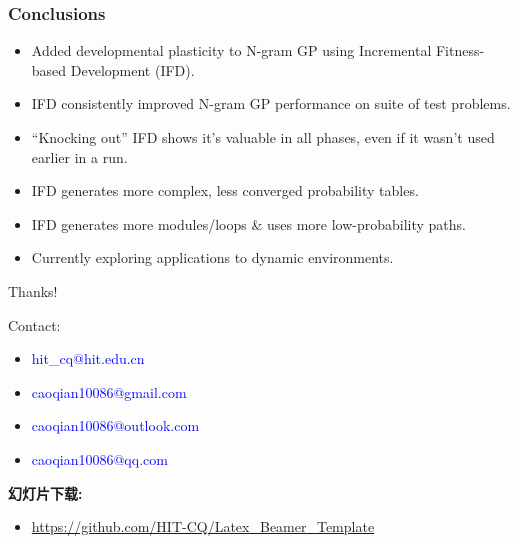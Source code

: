 \documentclass{beamer}
\newcommand{\linespace}{\vskip 0.25cm}
\begin{document}
\begin{frame}
\frametitle{Conclusions}

\begin{itemize}
  \item Added developmental plasticity to N-gram GP using Incremental Fitness-based Development (IFD).
\end{itemize}

\begin{itemize}
  \item IFD consistently improved N-gram GP performance on suite of test problems.
  
  \linespace
  
  \item ``Knocking out'' IFD shows it's valuable in all phases, even if it wasn't used earlier in a run.

  \linespace
  
  \item IFD generates more complex, less converged probability tables.
  \item IFD generates more modules/loops \& uses more low-probability paths.
\end{itemize}

\begin{itemize}
  \item Currently exploring applications to dynamic environments.
\end{itemize}

\end{frame}

\begin{frame}
	
	\begin{flushleft}
	{\huge Thanks!}
	\end{flushleft}
		
	\linespace
	\linespace
	
	Contact:  
	\begin{itemize}
		\item \textcolor{blue}{\textsf{hit\_cq@hit.edu.cn}}
		\item \textcolor{blue}{\textsf{caoqian10086@gmail.com}}
		\item \textcolor{blue}{\textsf{caoqian10086@outlook.com}}
		\item \textcolor{blue}{\textsf{caoqian10086@qq.com}}
	\end{itemize}
	\textbf{幻灯片下载:}  
	\begin{itemize}
		\item \textcolor{blue}{\textsf{\url{https://github.com/HIT-CQ/Latex_Beamer_Template}}}
	\end{itemize}
	\linespace
	\linespace
	
\end{frame}
\end{document}
